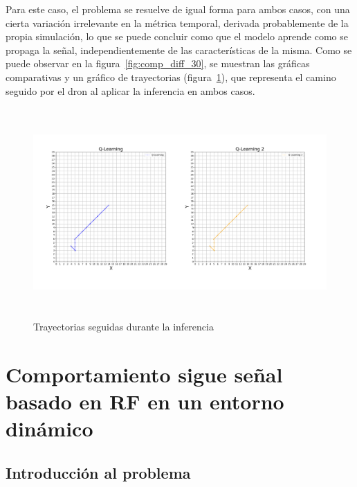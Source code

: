 Para este caso, el problema se resuelve de igual forma para ambos casos, con una cierta variación irrelevante en la métrica temporal, derivada probablemente de la propia simulación, lo que se puede concluir como que el modelo aprende como se propaga la señal, independientemente de las características de la misma. Como se puede observar en la figura~\ref{fig:comp_diff_30}, se muestran las gráficas comparativas y un gráfico de trayectorias (figura~\ref{fig:12_traj}), que representa el camino seguido por el dron al aplicar la inferencia en ambos casos.\\

\begin{figure} [tp]
    \begin{center}
    \includegraphics[height=8cm]{imagenes/cap4/13_trayectorias_12.png}
    \end{center}
    \caption[Trayectorias seguidas durante la inferencia]{Trayectorias seguidas durante la inferencia}
    \label{fig:12_traj}
\end{figure}

\section{Comportamiento sigue señal basado en \ac{RF} en un entorno dinámico}
\label{sec:signal_follow_obs}

\subsection{Introducción al problema}
\label{subsec:intro_sfo}

